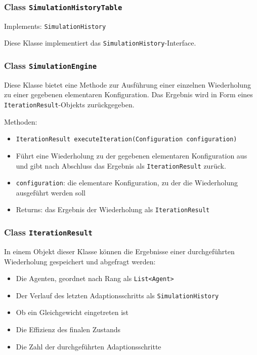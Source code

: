 \documentclass[parskip=full,11pt]{scrartcl}
\begin{document}
\subsubsection{Class \texttt{SimulationHistoryTable}}
Implements: \texttt{SimulationHistory}

Diese Klasse implementiert das \texttt{SimulationHistory}-Interface.

\subsubsection{Class \texttt{SimulationEngine}}

Diese Klasse bietet eine Methode zur Ausführung einer einzelnen Wiederholung zu einer gegebenen elementaren Konfiguration. Das Ergebnis wird in Form eines \texttt{IterationResult}-Objekts zurückgegeben.

Methoden:
\begin{itemize}\itemsep -10pt
\item \texttt{IterationResult executeIteration(Configuration configuration)}
\item[] Führt eine Wiederholung zu der gegebenen elementaren Konfiguration aus und gibt nach Abschluss das Ergebnis als \texttt{IterationResult} zurück.
\item[] \texttt{configuration}: die elementare Konfiguration, zu der die Wiederholung ausgeführt werden soll
\item[] Returns: das Ergebnis der Wiederholung als \texttt{IterationResult}
\end{itemize}

\subsubsection{Class \texttt{IterationResult}}
In einem Objekt dieser Klasse können die Ergebnisse einer durchgeführten Wiederholung gespeichert und abgefragt werden:
\begin{itemize}\itemsep -10pt
\item Die Agenten, geordnet nach Rang als \texttt{List<Agent>}
\item Der Verlauf des letzten Adaptionsschritts als \texttt{SimulationHistory}
\item Ob ein Gleichgewicht eingetreten ist
\item Die Effizienz des finalen Zustands
\item Die Zahl der durchgeführten Adaptionsschritte
\end{itemize}
\end{document}
